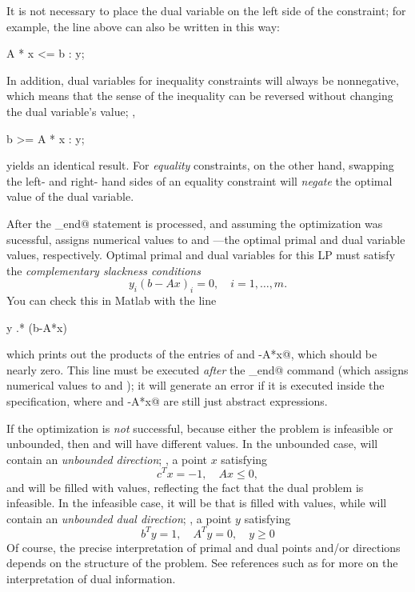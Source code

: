 \documentclass[12pt]{article}
\begin{document}
It is not necessary to place the dual variable on the left side of the
constraint; for example, the line above can also be written in this way:
\begin{code}
	A * x <= b : y;
\end{code}
In addition, dual variables for inequality constraints
will always be nonnegative, which means that the sense of the inequality 
can be reversed without changing the dual variable's value; \ie,
\begin{code}
	b >= A * x : y;
\end{code}
yields an identical result. For \emph{equality} constraints, on the other
hand, swapping the left- and right- hand sides of an equality constraint
will \emph{negate} the optimal value of the dual variable.

After the \verb@cvx_end@ statement is processed, and assuming the
optimization was sucessful, \cvx assigns numerical values to
\verb@x@ and \verb@y@---the optimal primal and dual variable values,
respectively. Optimal primal and dual variables for this LP must
satisfy the \emph{complementary slackness conditions}
\begin{equation}
	y_i ( b - A x )_i = 0, \quad i=1,\dots,m.
\end{equation}
You can check this in Matlab with the line
\begin{code}
	y .* (b-A*x)
\end{code}
which prints out the products of the entries of \verb@y@ and 
\verb@b-A*x@, which should be nearly zero.
This line must be executed \emph{after} the \verb@cvx_end@ command
(which assigns numerical values to \verb@x@ and \verb@y@); it will
generate an error if it is executed inside the \cvx specification,
where \verb@y@ and \verb@b-A*x@ are still just abstract expressions.

If the optimization is \emph{not} successful, because either the problem
is infeasible or unbounded, then \verb@x@ and \verb@y@ will have different
values. In the unbounded case, \verb@x@ will contain an \emph{unbounded direction};
\ie, a point $x$ satisfying
\begin{equation}
	c^T x = -1, \quad A x \leq 0,
\end{equation}
and \verb@y@ will be filled with \verb@NaN@ values, reflecting the fact
that the dual problem is infeasible. In the infeasible case, it will be
\verb@x@ that is filled with \verb@NaN@ values, while \verb@y@ will 
contain an \emph{unbounded dual direction}; \ie, a point $y$ satisfying
\begin{equation}
	b^T y = 1, \quad A^T y = 0, \quad y \geq 0
\end{equation}
Of course, the precise interpretation of primal and dual points and/or
directions depends on the structure of the problem. See references
such as \cite{BV:04} for more on the interpretation of dual information.
\end{document}
